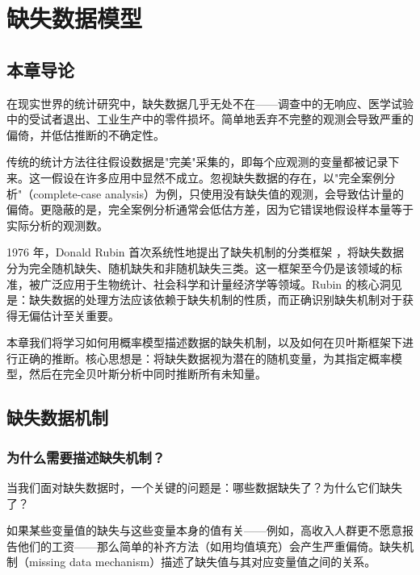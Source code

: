 
\chapter{缺失数据模型}
\label{ch:missing-data}

\section{本章导论}

在现实世界的统计研究中，缺失数据几乎无处不在——调查中的无响应、医学试验中的受试者退出、工业生产中的零件损坏。简单地丢弃不完整的观测会导致严重的偏倚，并低估推断的不确定性。

传统的统计方法往往假设数据是"完美"采集的，即每个应观测的变量都被记录下来。这一假设在许多应用中显然不成立。忽视缺失数据的存在，以"完全案例分析"（complete-case analysis）为例，只使用没有缺失值的观测，会导致估计量的偏倚。更隐蔽的是，完全案例分析通常会低估方差，因为它错误地假设样本量等于实际分析的观测数。

1976 年，Donald Rubin 首次系统性地提出了缺失机制的分类框架 \cite{Rubin1976}，将缺失数据分为完全随机缺失、随机缺失和非随机缺失三类。这一框架至今仍是该领域的标准，被广泛应用于生物统计、社会科学和计量经济学等领域。Rubin 的核心洞见是：缺失数据的处理方法应该依赖于缺失机制的性质，而正确识别缺失机制对于获得无偏估计至关重要。

本章我们将学习如何用概率模型描述数据的缺失机制，以及如何在贝叶斯框架下进行正确的推断。核心思想是：将缺失数据视为潜在的随机变量，为其指定概率模型，然后在完全贝叶斯分析中同时推断所有未知量。

\section{缺失数据机制}
\label{sec:missing-data-mechanisms}

\subsection{为什么需要描述缺失机制？}
\label{sec:why-describe-mechanism}

当我们面对缺失数据时，一个关键的问题是：哪些数据缺失了？为什么它们缺失了？

如果某些变量值的缺失与这些变量本身的值有关——例如，高收入人群更不愿意报告他们的工资——那么简单的补齐方法（如用均值填充）会产生严重偏倚。缺失机制（missing data mechanism）描述了缺失值与其对应变量值之间的关系。

